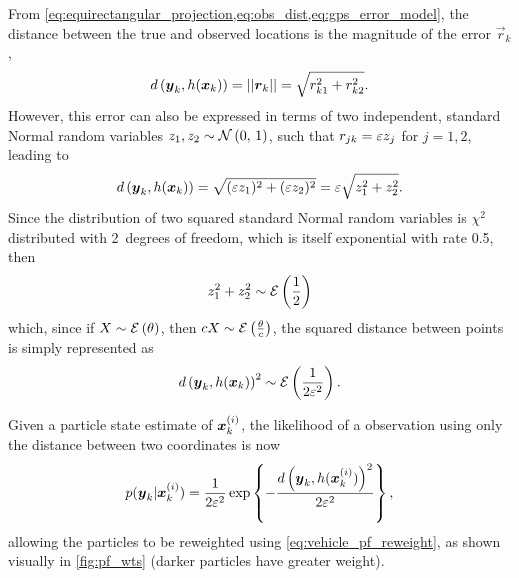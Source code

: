 From \cref{eq:equirectangular_projection,eq:obs_dist,eq:gps_error_model}, the distance between the true and observed locations is the magnitude of the error $\vec{r}_k$,
\begin{equation}
d\left(\boldsymbol{y}_k, h(\boldsymbol x_k)\right) = ||\boldsymbol{r}_k|| =
    \sqrt{r_{k1}^2 + r_{k2}^2}.
\end{equation}
However, this error can also be expressed in terms of two independent, standard Normal random variables $z_1, z_2 \sim \mathcal{N}\left(0,\, 1\right)$, such that $r_{jk} = \varepsilon z_j$ for $j = 1, 2$, leading to
\begin{equation}
d\left(\boldsymbol{y}_k, h(\boldsymbol x_k)\right) =
    \sqrt{(\varepsilon z_1)^2 + (\varepsilon z_2)^2} =
    \varepsilon \sqrt{z_1^2 + z_2^2}.
\end{equation}
Since the distribution of two squared standard Normal random variables is $\chi^2$ distributed with 2~degrees of freedom, which is itself exponential with rate 0.5, then
\begin{equation}
\label{eq:sum_sq_dist}
z_1^2 + z_2^2 \sim \mathcal{E}\left(\frac{1}{2}\right)
\end{equation}
which, since if $X \sim \mathcal{E}\left(\theta\right)$, then $cX \sim \mathcal{E}\left(\frac{\theta}{c}\right)$, the squared distance between points is simply represented as
\begin{equation}
\label{eq:distance_distrib}
d\left(\boldsymbol{y}_k, h(\boldsymbol x_k)\right)^2 \sim \mathcal{E}\left(\frac{1}{2\varepsilon^2}\right).
\end{equation}

Given a particle state estimate of $\boldsymbol x^{(i)}_k$,
the likelihood of a \GPS{} observation using only
the distance between two coordinates is now
\begin{equation}
\label{eq:particle_lh_fun}
p(\boldsymbol{y}_k | \boldsymbol x^{(i)}_k) =
    \frac{1}{2\varepsilon^2} \exp\left\{
        - \frac{d\left(\boldsymbol{y}_k, h(\boldsymbol x^{(i)}_k)\right)^2}{2\varepsilon^2}
    \right\},
\end{equation}
allowing the particles to be reweighted using \cref{eq:vehicle_pf_reweight}, as shown visually in \cref{fig:pf_wts} (darker particles have greater weight).


